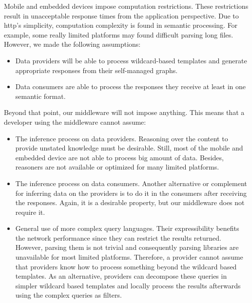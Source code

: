 Mobile and embedded devices impose computation restrictions.
These restrictions result in unacceptable response times from the application perspective.
Due to \ac{http}'s simplicity, computation complexity is found in semantic processing.
For example, some really limited platforms may found difficult parsing long files.
However, we made the following assumptions:
\begin{itemize}
  \item Data providers will be able to process wildcard-based templates and generate appropriate responses from their self-managed graphs.
  \item Data consumers are able to process the responses they receive at least in one semantic format. %
\end{itemize}


Beyond that point, our middleware will not impose anything.
This means that a developer using the middleware cannot assume:
\begin{itemize}
  \item The inference process on data providers.
        Reasoning over the content to provide unstated knowledge must be desirable.
        Still, most of the mobile and embedded device are not able to process big amount of data. %
        Besides, reasoners are not available or optimized for many limited platforms.
  \item The inference process on data consumers.
        Another alternative or complement for inferring data on the providers is to do it in the consumers after receiving the responses.
        Again, it is a desirable property, but our middleware does not require it.
  \item General use of more complex query languages.
        Their expressibility benefits the network performance since they can restrict the results returned.
        However, parsing them is not trivial and consequently parsing libraries are unavailable for most limited platforms.
        Therefore, a provider cannot assume that providers know how to process something beyond the wildcard based templates.
        As an alternative, providers can decompose these queries in simpler wildcard based templates and locally process the results afterwards using the complex queries as filters.
\end{itemize}


